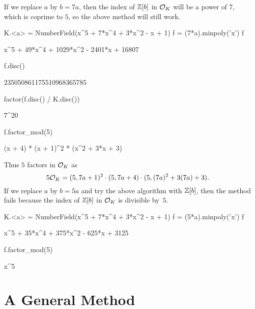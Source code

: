 If we replace $a$ by $b = 7a$, then the index of $\mathbb{Z}[b]$
in $\mathcal{O}_K$ will be a power of $7$, which is coprime to $5$,
so the above method will still work.
\begin{sagecode}
\begin{sagecell}
K.<a> = NumberField(x^5 + 7*x^4 + 3*x^2 - x + 1)
f = (7*a).minpoly('x')
f
\end{sagecell}
\begin{sageout}
x^5 + 49*x^4 + 1029*x^2 - 2401*x + 16807
\end{sageout}
\begin{sagecell}
f.disc()
\end{sagecell}
\begin{sageout}
235050861175510968365785
\end{sageout}
\begin{sagecell}
factor(f.disc() / K.disc())
\end{sagecell}
\begin{sageout}
7^20
\end{sageout}
\begin{sagecell}
f.factor_mod(5)
\end{sagecell}
\begin{sageout}
(x + 4) * (x + 1)^2 * (x^2 + 3*x + 3)
\end{sageout}
\end{sagecode}
Thus $5$ factors in $\mathcal{O}_K$
as
$$
	5\mathcal{O}_K = (5, 7a+1)^2 \cdot (5, 7a+4) \cdot (5, (7a)^2 + 3(7a) + 3).
$$
If we replace $a$ by $b=5a$ and try the above algorithm with $\mathbb{Z}[b]$, then
the method fails because the index of $\mathbb{Z}[b]$ in $\mathcal{O}_K$ is divisible by~$5$.
\begin{sagecode}
\begin{sagecell}
K.<a> = NumberField(x^5 + 7*x^4 + 3*x^2 - x + 1)
f = (5*a).minpoly('x')
f
\end{sagecell}
\begin{sageout}
x^5 + 35*x^4 + 375*x^2 - 625*x + 3125
\end{sageout}
\begin{sagecell}
f.factor_mod(5)
\end{sagecell}
\begin{sageout}
x^5
\end{sageout}
\end{sagecode}

\section{A General Method}

